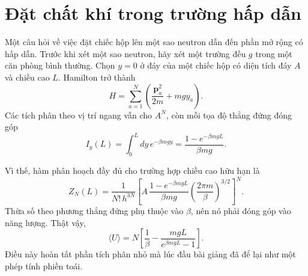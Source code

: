 \section{Đặt chất khí trong trường hấp dẫn}

Một câu hỏi về việc đặt chiếc hộp lên một sao neutron dẫn đến phần mở rộng có hấp dẫn. Trước khi xét một sao neutron, hãy xét một trường đều \(g\) trong một căn phòng bình thường. Chọn \(y=0\) ở đáy của một chiếc hộp có diện tích đáy \(A\) và chiều cao \(L\). Hamilton trở thành
\begin{equation}
 H=\sum_{a=1}^{N}
 \left(\frac{\bm p_a^2}{2m}+mgy_a\right).
 \label{eq:sm4-gravity-hamiltonian}
\end{equation}
Các tích phân theo vị trí ngang vẫn cho \(A^N\), còn mỗi tọa độ thẳng đứng đóng góp
\begin{equation}
 I_y(L)
 =\int_0^Ldy\,e^{-\beta mgy}
 =\frac{1-e^{-\beta mgL}}{\beta mg}.
 \label{eq:sm4-finite-height-integral}
\end{equation}

\begin{classroomqa}
\end{classroomqa}

Vì thế, hàm phân hoạch đầy đủ cho trường hợp chiều cao hữu hạn là
\begin{equation}
 Z_N(L)
 =
 \frac{1}{N!\,h^{3N}}
 \left[
  A\,
  \frac{1-e^{-\beta mgL}}{\beta mg}
  \left(\frac{2\pi m}{\beta}\right)^{3/2}
 \right]^N.
 \label{eq:sm4-gravity-partition-finite}
\end{equation}
Thừa số theo phương thẳng đứng phụ thuộc vào \(\beta\), nên nó phải đóng góp vào năng lượng. Thật vậy,
\begin{equation}
 \langle U\rangle
 =N\left[
  \frac{1}{\beta}
  -\frac{mgL}{e^{\beta mgL}-1}
 \right].
 \label{eq:sm4-finite-gravity-energy}
\end{equation}
Điều này hoàn tất phần tích phân nhỏ mà lúc đầu bài giảng đã để lại như một phép tính phiền toái.

